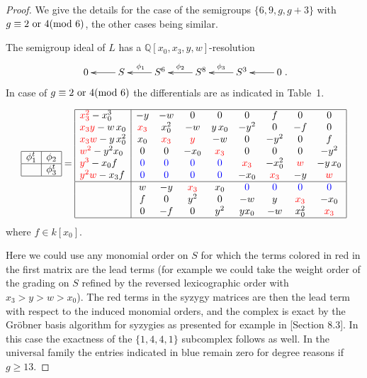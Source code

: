 \documentclass[twoside,12pt, leqno]{amsart}
\theoremstyle{definition}
\def\QQ{{\mathbb Q}}
\begin{document}
 
\begin{proof} We give the details for the case of the semigroups $\{6,9, g, g+3\}$ with 
$g\equiv 2 \hbox{ or } 4({\rm mod}\ 6)$, the other cases being similar.

The semigroup ideal  of $L$ has a $\QQ[x_{0},x_{3},y,w]$-resolution
$$\xymatrix{ 
0 & \ar[l] S & \ar[l]_{\phi_{1}} S^{6} & \ar[l]_{\phi_{2}} S^{8} & \ar[l]_{\phi_{3}} S^{3} &\ar[l] 0 \cr}.
$$
In case of $g\equiv 2 \hbox{ or } 4 ({\rm mod}\ 6)$ the differentials are as indicated in Table~1.

 \begin{table}\label{syzygytable}
$$ \begin{array}{|c|c|} \hline
               \phi_{1}^{t}& \phi_{2} \cr \hline
                                 & \phi_{3}^{t} \cr \hline
       \end{array}=
\begin{array}{|l|cccc cccc|}\hline
       {\color{red}x_{3}^{2}}-x_{0}^{3} & -y&-w&0&0&0&f&0&0\cr
       {\color{red}x_{3}y}-w\,x_{0}        &  {\color{red}x_{3}}&x_{0}^{2}&-w&y\,x_{0}&-y^{2}&0&-f&0\cr
       {\color{red}x_{3}w}-y\,x_{0}^{2}  &  x_{0}& {\color{red}x_{3}}& {\color{red}y}&-w&0&-y^{2}&0&f\cr     
       {\color{red}w^{2}}-y^{2}x_{0}      &  0&0&-x_{0}& {\color{red}x_{3}}&0&0&0&-y^{2}\cr
       {\color{red}y^{3}}-x_{0}f                     & {\color{blue}0}&{\color{blue}0}&{\color{blue}0}&{\color{blue}0}&{\color{red}x_{3}}&-x_{0}^{2}&{\color{red}w}&-y\,x_{0}\cr
              {\color{red}y^{2}w}-x_{3}f                 & {\color{blue}0}&{\color{blue}0}&{\color{blue}0}&{\color{blue}0}&-x_{0}& {\color{red}x_{3}}& -y&{\color{red}w}\cr\hline
                                                          & w&-y& {\color{red}x_{3}}&x_{0}&{\color{blue}0}&{\color{blue}0}&{\color{blue}0}&{\color{blue}0}\cr
                                                          &f&0&y^{2}&0&-w&y&{\color{red}x_{3}}&-x_{0}\cr
                                                          & 0&-f&0&y^{2}&yx_{0}&-w&x_{0}^{2}&{\color{red}x_{3}}\cr\hline
                                                          \end{array} $$
                  \noindent       
where   $f \in k[x_{0}] $. 
\caption{Syzygy matrices for semigroups $\{6,9,g,g+3\}$ for $g\equiv 2 \hbox{ or } 4({\rm mod}\ 6)$.}
 \end{table}

Here we could use any monomial order on $S$ for which the terms colored in {\color{red}red} in the first matrix are the lead terms (for example we could take the weight order of the grading on $S$ refined by the reversed lexicographic order with $x_{3}>y>w >x_{0}$). The red terms in the syzygy matrices are then the lead term with respect to the induced monomial orders, and the complex is exact by
 the Gr\"obner basis algorithm for syzygies as presented for example in \cite{Schreyer25}[Section 8.3].  In this case the exactness
 of the $\{1,4,4,1\}$ subcomplex follows as well. 
In the universal family the entries indicated in {\color{blue}blue} remain zero for degree reasons if $g\ge 13$.
\end{proof}
\end{document}

